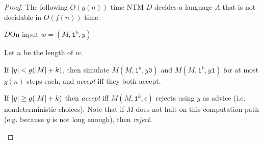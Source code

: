 \documentclass[11pt,twoside=off,numbers=noenddot]{scrbook}
\begin{document}
\begin{proof}
  The following $O(g(n))$ time NTM $D$ decides a language $A$ that is not decidable in $O(f(n))$ time.

  \begin{turing}{$D$}{On input $w = (M, \texttt{1}^k, y)$}
  \item Let $n$ be the length of $w$.
  \item If $| y | < g(| M | + k)$, then simulate $M(M, \texttt{1}^k, y\texttt{0})$ and $M(M, \texttt{1}^k, y\texttt{1})$ for at most $g(n)$ steps each, and \emph{accept} iff they both accept.
  \item If $| y | \geq g(| M | + k)$ then \emph{accept} iff $M(M, \texttt{1}^k, \epsilon)$ rejects using $y$ as advice (i.e. nondeterministic choices). Note that if $M$ does not halt on this computation path (e.g. because $y$ is not long enough), then \emph{reject}.
  \end{turing}


\end{proof}
\end{document}
